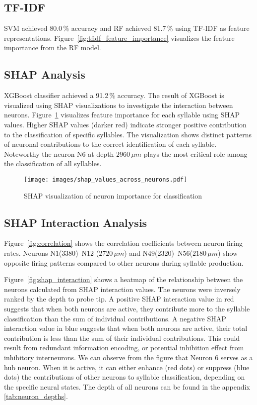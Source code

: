 \documentclass[../CLthesis.tex]{subfiles}
\begin{document}
\subsection{TF-IDF}
SVM achieved 80.0\,\% accuracy and RF achieved 81.7\,\% using TF-IDF as feature representations. Figure~\ref{fig:tfidf_feature_importance} visualizes the feature importance from the RF model. 

\subsection{SHAP Analysis}
XGBoost classifier achieved a 91.2\,\% accuracy. The result of XGBoost is visualized using SHAP visualizations to investigate the interaction between neurons. Figure~\ref{fig:shap} visualizes feature importance for each syllable using SHAP values. Higher SHAP values (darker red) indicate stronger positive contribution to the classification of specific syllables. The visualization shows distinct patterns of neuronal contributions to the correct identification of each syllable. Noteworthy the neuron N$6$ at depth $2960\,\mu m$ plays the most critical role among the classification of all syllables. 
\begin{figure}[htbp]
   \centering
   \texttt{[image: images/shap\_values\_across\_neurons.pdf]}
   \caption{SHAP visualization of neuron importance for classification}
   \label{fig:shap}     
\end{figure}

\subsection{SHAP Interaction Analysis}
Figure~\ref{fig:correlation} shows the correlation coefficients between neuron firing rates. Neurons N$1$($3380$)--N$12$ ($2720\,\mu m$) and N$49$($2320$)--N$56$($2180\,\mu m$) show opposite firing patterns compared to other neurons during syllable production. 

Figure~\ref{fig:shap_interaction} shows a heatmap of the relationship between the neurons calculated from SHAP interaction values. The neurons were inversely ranked by the depth to probe tip. A positive SHAP interaction value in red suggests that when both neurons are active, they contribute more to the syllable classification than the sum of individual contributions. A negative SHAP interaction value in blue suggests that when both neurons are active, their total contribution is less than the sum of their individual contributions. This could result from redundant information encoding, or potential inhibition effect from inhibitory interneurons. We can observe from the figure that Neuron $6$ serves as a hub neuron. When it is active, it can either enhance (red dots) or suppress (blue dots) the contributions of other neurons to syllable classification, depending on the specific neural states. The depth of all neurons can be found in the appendix \ref{tab:neuron_depths}.
\end{document}
